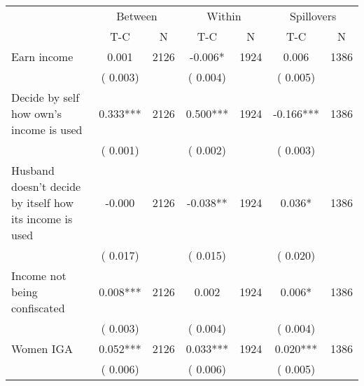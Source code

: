
\begin{tabular}{l*{6}{c}}\hline&\multicolumn{2}{c}{Between}&\multicolumn{2}{c}{Within}&\multicolumn{2}{c}{Spillovers} \\ \cmidrule(r){2-3}\cmidrule(l){4-5}\cmidrule(l){6-7} & {T-C} & {N} & {T-C} & {N}  & {T-C}  & {N}  \\ \midrule
Earn income        &              0.001      &       2126       &             -0.006*      &       1924       &              0.006      &       1386       \\
                       &       (       0.003)            &                               &       (       0.004)            &                               &       (       0.005)            &                               \\
Decide by self how own's income is used        &              0.333***      &       2126       &              0.500***      &       1924       &             -0.166***      &       1386       \\
                       &       (       0.001)            &                               &       (       0.002)            &                               &       (       0.003)            &                               \\
Husband doesn't decide by itself how its income is used        &             -0.000      &       2126       &             -0.038**      &       1924       &              0.036*      &       1386       \\
                       &       (       0.017)            &                               &       (       0.015)            &                               &       (       0.020)            &                               \\
Income not being confiscated        &              0.008***      &       2126       &              0.002      &       1924       &              0.006*      &       1386       \\
                       &       (       0.003)            &                               &       (       0.004)            &                               &       (       0.004)            &                               \\
Women IGA        &              0.052***      &       2126       &              0.033***      &       1924       &              0.020***      &       1386       \\
                       &       (       0.006)            &                               &       (       0.006)            &                               &       (       0.005)            &                               \\
\hline \end{tabular}